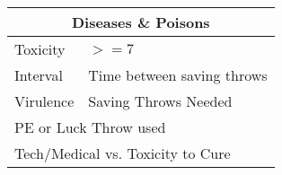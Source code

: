 \documentclass[10pt,letterpaper]{article}
\begin{document}
\begin{multicols}{3}
\begin{tabularx}{\columnwidth}{| l | X |}
        \hline
    \end{tabularx}
    \begin{tabularx}{\columnwidth}{| l | X |}
        \hline
        \multicolumn{2}{|c|}{\textbf{Diseases \& Poisons}} \\
        \hline
        Toxicity & $>= 7$ \\
        \hline
        Interval & Time between saving throws \\
        \hline
        Virulence & Saving Throws Needed \\
        \hline
        \multicolumn{2}{|l|}{PE or Luck Throw used} \\
        \hline
        \multicolumn{2}{|l|}{Tech/Medical vs. Toxicity to Cure} \\
        \hline
    \end{tabularx}
\end{multicols}
\end{document}
